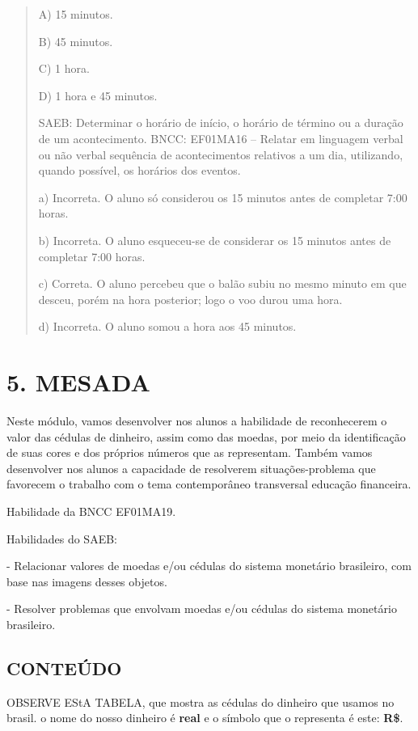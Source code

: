 \begin{quote}
A) 15 minutos.

B) 45 minutos.

C) 1 hora.

D) 1 hora e 45 minutos.

SAEB: Determinar o horário de início, o horário de término ou a
duração de um acontecimento.
BNCC: EF01MA16 -- Relatar em linguagem verbal ou não verbal sequência de
acontecimentos relativos a um dia, utilizando, quando possível, os
horários dos eventos.

a) Incorreta. O aluno só considerou os 15 minutos antes de
completar 7:00 horas.

b) Incorreta. O aluno esqueceu-se de considerar os 15 minutos antes de
completar 7:00 horas.

c) Correta. O aluno percebeu que o balão subiu no mesmo minuto em
que desceu, porém na hora posterior; logo o voo durou uma hora.

d) Incorreta. O aluno somou a hora aos 45 minutos.
\end{quote}

\section{5. MESADA}\label{muxf3dulo-5-quero-mesada}

Neste módulo, vamos desenvolver nos alunos a habilidade de reconhecerem o
valor das cédulas de dinheiro, assim como das moedas, por meio da
identificação de suas cores e dos próprios números que as representam.
Também vamos desenvolver nos alunos a capacidade de resolverem situações-problema que favorecem o trabalho com o tema contemporâneo transversal educação financeira.

Habilidade da BNCC
EF01MA19.

Habilidades do SAEB:

- Relacionar valores de moedas e/ou cédulas do sistema monetário
brasileiro, com base nas imagens desses objetos.

- Resolver problemas que envolvam moedas e/ou cédulas do sistema
monetário brasileiro.

\subsection{CONTEÚDO}\label{conteuxfado-4}

OBSERVE EStA TABELA, que
mostra as cédulas do dinheiro que usamos no brasil. o nome do nosso
dinheiro é \textbf{real} e o símbolo que o representa é este: \textbf{R\$}.

